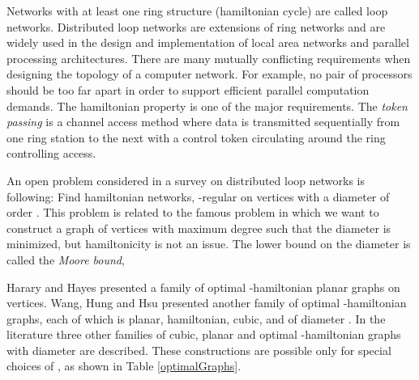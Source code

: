 \documentclass[10pt,a4paper]{article}
\newcommand{\rz}{\vspace{0.1cm}}
\begin{document}
Networks with at least one ring structure (hamiltonian cycle) are
called loop networks. Distributed loop networks are extensions of
ring networks and are widely used in the design and implementation
of local area networks and parallel processing architectures. There
are many mutually conflicting requirements when designing the
topology of a computer network. For example, no pair of processors
should be too far apart in order to support efficient parallel
computation demands. The hamiltonian property is one of the major
requirements. The \emph{token passing} is a channel access method
where data is transmitted sequentially from one ring station to the
next with a control token circulating around the ring controlling
access. \rz

An open problem considered in a survey  on
distributed loop networks is following: Find hamiltonian networks,
-regular on  vertices with a diameter of order . This problem is related to the famous  problem
in which we want to construct a graph of  vertices with maximum
degree  such that the diameter  is minimized, but
hamiltonicity is not an issue. The lower bound on the diameter 
is called the \emph{Moore bound},





Harary and Hayes  presented a family of optimal
-hamiltonian planar graphs on  vertices. Wang, Hung and Hsu
 presented another family of optimal -hamiltonian
graphs, each of which is planar, hamiltonian, cubic, and of diameter
. In the literature three other families of cubic,
planar and optimal -hamiltonian graphs with diameter 
are described. These constructions are possible only for special
choices of , as shown in Table \ref{optimalGraphs}. \rz
\end{document}
